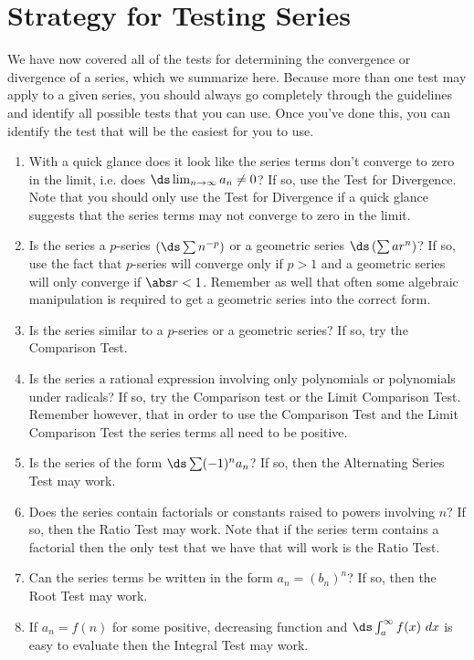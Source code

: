 \section{Strategy for Testing Series}\label{sec:series_techniques}

We have now covered all of the tests for determining the convergence or divergence of a series, which we summarize here. Because more than one test may apply to a given series, you should always go completely through the guidelines and identify all possible tests that you can use. Once you've done this, you can identify the test that will be the easiest for you to use.

\begin{enumerate}
\item With a quick glance does it look like the series terms don't converge to zero in the limit, i.e. does $\ds \lim_{n\to \infty}a_n \neq 0$? If so, use the Test for Divergence. Note that you should only use the Test for Divergence if a quick glance suggests that the series terms may not converge to zero in the limit.

\item Is the series a $p$-series $\left(\ds\sum n^{-p}\right)$ or a geometric series $\ds \left( \sum ar^n\right)$? If so, use the fact that $p$-series will converge only  if $p>1$ and a geometric series will only converge if $\abs r<1$. Remember as well that often some algebraic manipulation is required to get a geometric series into the correct form.

\item Is the series similar to a $p$-series or a geometric series? If so, try the Comparison Test.

\item Is the series a rational expression involving only polynomials or polynomials under radicals? If so, try the Comparison test or the Limit Comparison Test. Remember however, that in order to use the Comparison Test and the Limit Comparison Test the series terms all need to be positive.

\item Is the series of the form $\ds \sum (-1)^n a_n$? If so, then the Alternating Series Test may work.

\item Does the series contain factorials or constants raised to powers involving $n$? If so, then the Ratio Test may work. Note that if the series term contains a factorial then the only test that we have that will work is the Ratio Test.

\item Can the series terms be written in the form $a_n=(b_n)^n$? If so, then the Root Test may work.

\item If $a_n=f(n)$ for some positive, decreasing function and $\ds \int_a^\infty f(x)\ dx$ is easy to evaluate then the Integral Test may work.
\end{enumerate}

